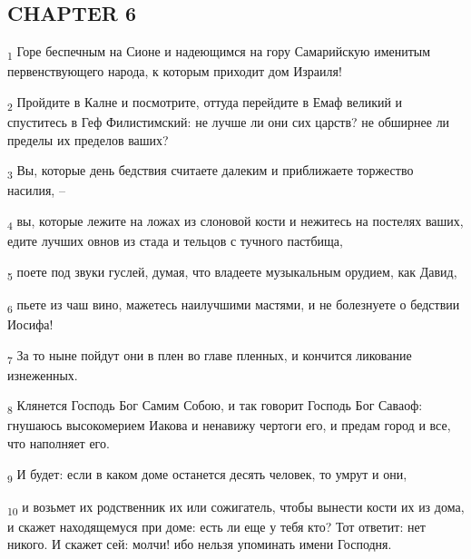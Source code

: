 \subsection{CHAPTER 6}
\begin{tcolorbox}
\textsubscript{1} Горе беспечным на Сионе и надеющимся на гору Самарийскую именитым первенствующего народа, к которым приходит дом Израиля!
\end{tcolorbox}
\begin{tcolorbox}
\textsubscript{2} Пройдите в Калне и посмотрите, оттуда перейдите в Емаф великий и спуститесь в Геф Филистимский: не лучше ли они сих царств? не обширнее ли пределы их пределов ваших?
\end{tcolorbox}
\begin{tcolorbox}
\textsubscript{3} Вы, которые день бедствия считаете далеким и приближаете торжество насилия, --
\end{tcolorbox}
\begin{tcolorbox}
\textsubscript{4} вы, которые лежите на ложах из слоновой кости и нежитесь на постелях ваших, едите лучших овнов из стада и тельцов с тучного пастбища,
\end{tcolorbox}
\begin{tcolorbox}
\textsubscript{5} поете под звуки гуслей, думая, что владеете музыкальным орудием, как Давид,
\end{tcolorbox}
\begin{tcolorbox}
\textsubscript{6} пьете из чаш вино, мажетесь наилучшими мастями, и не болезнуете о бедствии Иосифа!
\end{tcolorbox}
\begin{tcolorbox}
\textsubscript{7} За то ныне пойдут они в плен во главе пленных, и кончится ликование изнеженных.
\end{tcolorbox}
\begin{tcolorbox}
\textsubscript{8} Клянется Господь Бог Самим Собою, и так говорит Господь Бог Саваоф: гнушаюсь высокомерием Иакова и ненавижу чертоги его, и предам город и все, что наполняет его.
\end{tcolorbox}
\begin{tcolorbox}
\textsubscript{9} И будет: если в каком доме останется десять человек, то умрут и они,
\end{tcolorbox}
\begin{tcolorbox}
\textsubscript{10} и возьмет их родственник их или сожигатель, чтобы вынести кости их из дома, и скажет находящемуся при доме: есть ли еще у тебя кто? Тот ответит: нет никого. И скажет сей: молчи! ибо нельзя упоминать имени Господня.
\end{tcolorbox}

